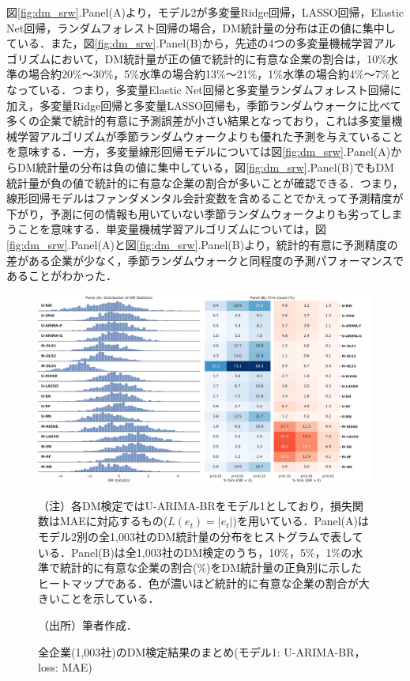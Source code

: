 \documentclass[a4paper，11pt]{jsarticle}
\begin{document}
図\ref{fig:dm_srw}.Panel(A)より，モデル2が多変量Ridge回帰，LASSO回帰，Elastic Net回帰，ランダムフォレスト回帰の場合，DM統計量の分布は正の値に集中している．また，図\ref{fig:dm_srw}.Panel(B)から，先述の4つの多変量機械学習アルゴリズムにおいて，DM統計量が正の値で統計的に有意な企業の割合は，10\%水準の場合約20\%～30\%，5\%水準の場合約13\%～21\%，1\%水準の場合約4\%～7\%となっている．つまり，多変量Elastic Net回帰と多変量ランダムフォレスト回帰に加え，多変量Ridge回帰と多変量LASSO回帰も，季節ランダムウォークに比べて多くの企業で統計的有意に予測誤差が小さい結果となっており，これは多変量機械学習アルゴリズムが季節ランダムウォークよりも優れた予測を与えていることを意味する．一方，多変量線形回帰モデルについては図\ref{fig:dm_srw}.Panel(A)からDM統計量の分布は負の値に集中している，図\ref{fig:dm_srw}.Panel(B)でもDM統計量が負の値で統計的に有意な企業の割合が多いことが確認できる．つまり，線形回帰モデルはファンダメンタル会計変数を含めることでかえって予測精度が下がり，予測に何の情報も用いていない季節ランダムウォークよりも劣ってしまうことを意味する．単変量機械学習アルゴリズムについては，図\ref{fig:dm_srw}.Panel(A)と図\ref{fig:dm_srw}.Panel(B)より，統計的有意に予測精度の差がある企業が少なく，季節ランダムウォークと同程度の予測パフォーマンスであることがわかった．

\begin{figure}[tbp]
  \centering
  \caption{全企業(1,003社)のDM検定結果のまとめ(モデル1: U-ARIMA-BR，loss: MAE)}
  \label{fig:dm_sarima_br}
  \includegraphics[width=\linewidth]{./img/_dm_MAD_y_hat_sarima_br.pdf}
  \begin{threeparttable}
  \begin{tablenotes}
    \item[]（注）各DM検定ではU-ARIMA-BRをモデル1としており，損失関数はMAEに対応するもの($L(e_t)=|e_t|$)を用いている．Panel(A)はモデル2別の全1,003社のDM統計量の分布をヒストグラムで表している．Panel(B)は全1,003社のDM検定のうち，10\%，5\%，1\%の水準で統計的に有意な企業の割合(\%)をDM統計量の正負別に示したヒートマップである．色が濃いほど統計的に有意な企業の割合が大きいことを示している．
    \item[]（出所）筆者作成．
  \end{tablenotes}
  \end{threeparttable}
\end{figure}
\end{document}
